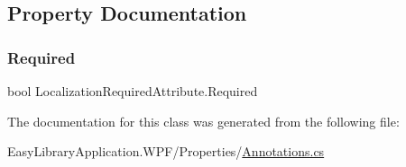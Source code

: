 \subsection{Property Documentation}
\mbox{\label{class_localization_required_attribute_af8b46c34356964b9b15c22c7e5113d23}} 
\subsubsection{\texorpdfstring{Required}{Required}}
{\footnotesize\ttfamily bool Localization\+Required\+Attribute.\+Required\hspace{0.3cm}{\ttfamily [get]}}



The documentation for this class was generated from the following file\+:\begin{DoxyCompactItemize}
\item 
Easy\+Library\+Application.\+W\+P\+F/\+Properties/\mbox{\hyperlink{_annotations_8cs}{Annotations.\+cs}}\end{DoxyCompactItemize}
